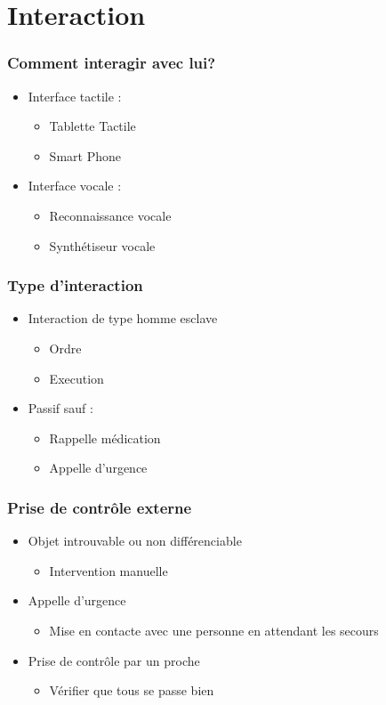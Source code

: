 \section{Interaction}
\begin{frame}
  \frametitle{Comment interagir avec lui?}
      	\begin{itemize}
      	\item Interface tactile :
        	\begin{itemize}
        	\item Tablette Tactile
        	\item Smart Phone 
        	\end{itemize}
	\item Interface vocale :
		\begin{itemize}
		\item Reconnaissance vocale
		\item Synthétiseur vocale
		\end{itemize}
      \end{itemize}
\end{frame}

\begin{frame}
	\frametitle{Type d'interaction}
	\begin{itemize}
	\item Interaction de type homme esclave
		\begin{itemize}
		\item Ordre
		\item Execution
		\end{itemize}
	\item Passif sauf :
		\begin{itemize}
		\item Rappelle médication
		\item Appelle d'urgence
		\end{itemize}
	\end{itemize}
\end{frame}

\begin{frame}
	\frametitle{Prise de contrôle externe}
	\begin{itemize}
	\item Objet introuvable ou non différenciable
		\begin{itemize}
		\item Intervention manuelle
		\end{itemize}
	\item Appelle d'urgence
		\begin{itemize}
		\item Mise en contacte avec une personne en attendant les secours
		\end{itemize}
	\item Prise de contrôle par un proche
		\begin{itemize}
		\item Vérifier que tous se passe bien
		\end{itemize}
	\end{itemize}
\end{frame}

